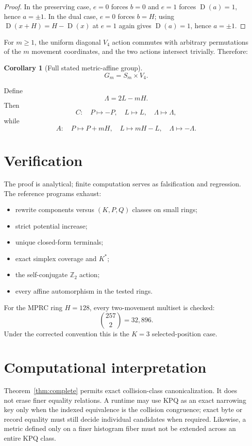 \documentclass[11pt]{article}
\newtheorem{corollary}[theorem]{Corollary}
\theoremstyle{definition}
\newcommand{\Z}{\mathbb{Z}}
\newcommand{\D}{\operatorname{D}}
\newcommand{\1}{\mathbf{1}}
\begin{document}
\begin{proof}
In the preserving case, $e=0$ forces $b=0$ and $e=1$ forces $\D(a)=1$, hence $a=\pm1$. In the dual case, $e=0$ forces $b=H$; using $\D(x+H)=H-\D(x)$ at $e=1$ again gives $\D(a)=1$, hence $a=\pm1$.
\end{proof}

For $m\ge1$, the uniform diagonal $V_4$ action commutes with arbitrary permutations of the $m$ movement coordinates, and the two actions intersect trivially. Therefore:

\begin{corollary}[Full stated metric-affine group]
\[
\boxed{
G_m=S_m\times V_4.
}
\]
\end{corollary}

Define
\[
\Lambda=2L-mH.
\]
Then
\[
C:\quad P\mapsto-P,\quad L\mapsto L,\quad \Lambda\mapsto\Lambda,
\]
while
\[
A:\quad P\mapsto P+mH,\quad L\mapsto mH-L,\quad \Lambda\mapsto-\Lambda.
\]

\section{Verification}
The proof is analytical; finite computation serves as falsification and regression. The reference programs exhaust:
\begin{itemize}[leftmargin=*]
\item rewrite components versus $(K,P,Q)$ classes on small rings;
\item strict potential increase;
\item unique closed-form terminals;
\item exact simplex coverage and $K^\ast$;
\item the self-conjugate $\Z_2$ action;
\item every affine automorphism in the tested rings.
\end{itemize}

For the MPRC ring $H=128$, every two-movement multiset is checked:
\[
\binom{257}{2}=32{,}896.
\]
Under the corrected convention this is the $K=3$ selected-position case.

\section{Computational interpretation}
Theorem~\ref{thm:complete} permits exact collision-class canonicalization. It does not erase finer equality relations. A runtime may use KPQ as an exact narrowing key only when the indexed equivalence is the collision congruence; exact byte or record equality must still decide individual candidates when required. Likewise, a metric defined only on a finer histogram fiber must not be extended across an entire KPQ class.
\end{document}

